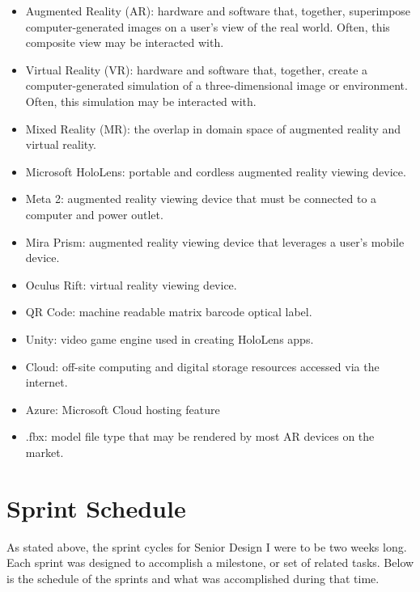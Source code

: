 \begin{itemize}
	\item Augmented Reality (AR): hardware and software that, together, superimpose computer-generated images on a user's view of the real world. Often, this composite view may be interacted with. 

	\item Virtual Reality (VR): hardware and software that, together, create a computer-generated simulation of a three-dimensional image or environment. Often, this simulation may be interacted with. 

	\item Mixed Reality (MR): the overlap in domain space of augmented reality and virtual reality. 

	\item Microsoft HoloLens: portable and cordless augmented reality viewing device. 

	\item Meta 2: augmented reality viewing device that must be connected to a computer and power outlet. 

	\item Mira Prism: augmented reality viewing device that leverages a user's mobile device.

	\item Oculus Rift: virtual reality viewing device. 

    \item QR Code: machine readable matrix barcode optical label.
    
    \item Unity: video game engine used in creating HoloLens apps.

	\item Cloud: off-site computing and digital storage resources accessed via the internet. 

    \item Azure: Microsoft Cloud hosting feature

	\item .fbx: model file type that may be rendered by most AR devices on the market. 
\end{itemize}


\section{Sprint Schedule}
As stated above, the sprint cycles for Senior Design I were to be two weeks long. Each sprint was designed to accomplish a milestone, or set of related tasks. Below is the schedule of the sprints and what was accomplished during that time.

